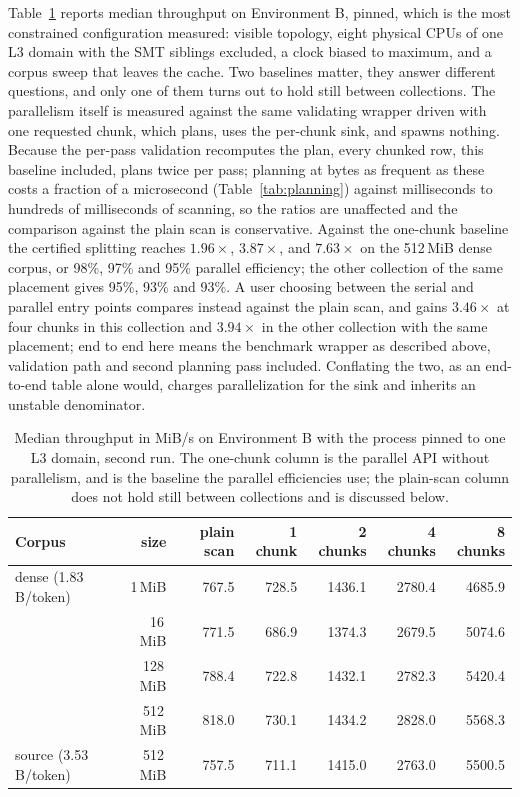 \documentclass[11pt,a4paper]{article}
\theoremstyle{definition}
\theoremstyle{plain}
\begin{document}
Table~\ref{tab:scaling} reports median throughput on Environment B, pinned, which is the most constrained
configuration measured: visible topology, eight physical CPUs of one L3 domain with the SMT siblings excluded, a clock
biased to maximum, and a corpus sweep that leaves the cache. Two baselines matter, they answer different questions,
and only one of them turns out to hold still between collections. The parallelism itself is measured against the same
validating wrapper driven with one requested chunk, which plans, uses the per-chunk sink, and spawns nothing. Because
the per-pass validation recomputes the plan, every chunked row, this baseline included, plans twice per pass; planning
at bytes as frequent as these costs a fraction of a microsecond (Table~\ref{tab:planning}) against milliseconds to
hundreds of milliseconds of scanning, so the ratios are unaffected and the comparison against the plain scan is
conservative. Against the one-chunk baseline the certified splitting reaches $1.96\times$, $3.87\times$, and
$7.63\times$ on the 512\,MiB dense corpus, or 98\%, 97\% and 95\% parallel efficiency; the other collection of the
same placement gives 95\%, 93\% and 93\%. A user choosing between the serial and parallel entry points compares
instead against the plain scan, and gains $3.46\times$ at four chunks in this collection and $3.94\times$ in the other
collection with the same placement; end to end here means the benchmark wrapper as described above, validation path
and second planning pass included. Conflating the two, as an end-to-end table alone would, charges parallelization for
the sink and inherits an unstable denominator.

\begin{table}[t]
\centering
\begin{tabular}{lrrrrrr}
\toprule
Corpus & size & plain scan & 1 chunk & 2 chunks & 4 chunks & 8 chunks \\
\midrule
dense (1.83 B/token)  & 1\,MiB    & 767.5 & 728.5 & 1436.1 & 2780.4 & 4685.9 \\
                      & 16\,MiB   & 771.5 & 686.9 & 1374.3 & 2679.5 & 5074.6 \\
                      & 128\,MiB  & 788.4 & 722.8 & 1432.1 & 2782.3 & 5420.4 \\
                      & 512\,MiB  & 818.0 & 730.1 & 1434.2 & 2828.0 & 5568.3 \\
\midrule
source (3.53 B/token) & 512\,MiB  & 757.5 & 711.1 & 1415.0 & 2763.0 & 5500.5 \\
\bottomrule
\end{tabular}
\caption{Median throughput in MiB/s on Environment B with the process pinned to one L3 domain, second run. The
one-chunk column is the parallel API without parallelism, and is the baseline the parallel efficiencies use; the
plain-scan column does not hold still between collections and is discussed below.}
\label{tab:scaling}
\end{table}
\end{document}

